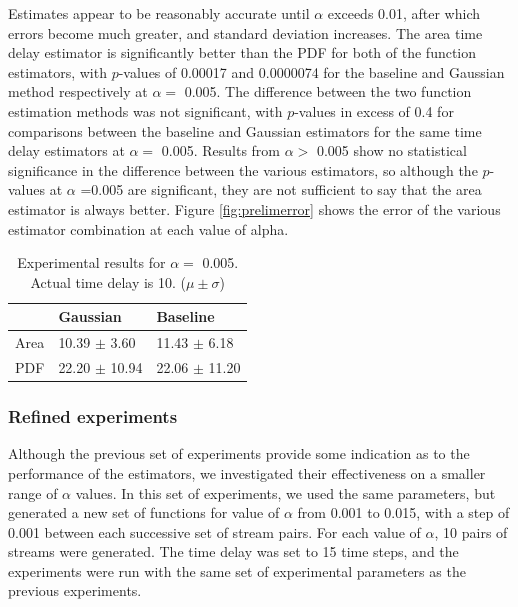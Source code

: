 \documentclass[a4paper,11pt]{article}
\begin{document}
Estimates appear to be reasonably accurate until $\alpha$ exceeds 0.01, after
which errors become much greater, and standard deviation increases. The area
time delay estimator is significantly better than the PDF for both of the
function estimators, with $p$-values of 0.00017 and 0.0000074 for the baseline
and Gaussian method respectively at $\alpha=$ 0.005. The difference between the
two function estimation methods was not significant, with $p$-values in excess
of 0.4 for comparisons between the baseline and Gaussian estimators for the same
time delay estimators at $\alpha=$ 0.005. Results from $\alpha>$ 0.005 show no
statistical significance in the difference between the various estimators, so
although the $p$-values at $\alpha$ =0.005 are significant, they are not
sufficient to say that the area estimator is always better. Figure
\ref{fig:prelimerror} shows the error of the various estimator combination at
each value of alpha.

\begin{table}[htb]
\caption{Experimental results for $\alpha=$ 0.005. Actual time delay is 10. ($\mu\pm\sigma$)} \label{fig:pretab}
\begin{center}
\begin{tabular}{l|ll}
       &  Gaussian           &  Baseline           \\
\hline
 Area  &  10.39 $\pm$ 3.60   &  11.43 $\pm$ 6.18   \\
 PDF   &  22.20 $\pm$ 10.94  &  22.06 $\pm$ 11.20  \\
\end{tabular}
\end{center}
\end{table}
\subsubsection{Refined experiments}
\label{sec-7-1-2}

Although the previous set of experiments provide some indication as to the
performance of the estimators, we investigated their effectiveness on a smaller
range of $\alpha$ values. In this set of experiments, we used the same
parameters, but generated a new set of functions for value of $\alpha$ from
0.001 to 0.015, with a step of 0.001 between each successive set of stream
pairs. For each value of $\alpha$, 10 pairs of streams were generated. The time
delay was set to 15 time steps, and the experiments were run with the same set
of experimental parameters as the previous experiments.
\end{document}
